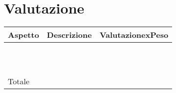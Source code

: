 \section{Valutazione}
\begin{longtable}{| p{4.5cm} | p{4.5cm} | l |}

\hline
\hline
\textbf{Aspetto} & \textbf{Descrizione} & \textbf{ValutazionexPeso} \\ 
\hline
\hline

\nameref{sezioni} &  &  \\
\hline
\nameref{general} &  &  \\
\hline
\nameref{where} &  &  \\
\hline
\nameref{who} &  &  \\
\hline
\nameref{why} &  &  \\
\hline
\nameref{what} &  &  \\
\hline
\nameref{when} &  &  \\
\hline
\nameref{how} &  & \\
\hline
\nameref{usecase} &  &  \\
\hline
\nameref{searchfun} &  &  \\
\hline
\nameref{contenuto} &  &  \\
\hline
\hline
Totale & &  \\
\hline
\hline

\end{longtable}